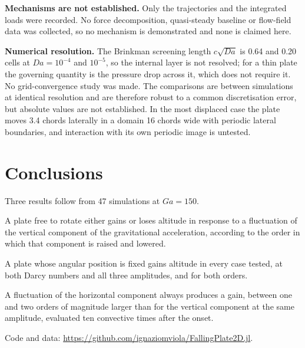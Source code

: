 \documentclass[11pt,a4paper]{article}
\begin{document}
\textbf{Mechanisms are not established.} Only the trajectories and the
integrated loads were recorded. No force decomposition, quasi-steady baseline
or flow-field data was collected, so no mechanism is demonstrated and none is
claimed here.

\textbf{Numerical resolution.} The Brinkman screening length $c\sqrt{Da}$ is
0.64 and 0.20 cells at $Da=10^{-4}$ and $10^{-5}$, so the internal layer is
not resolved; for a thin plate the governing quantity is the pressure drop
across it, which does not require it. No grid-convergence study was made. The
comparisons are between simulations at identical resolution and are therefore
robust to a common discretisation error, but absolute values are not
established. In the most displaced case the plate moves 3.4 chords laterally
in a domain 16 chords wide with periodic lateral boundaries, and interaction
with its own periodic image is untested.

\section{Conclusions}

Three results follow from 47 simulations at $Ga=150$.

A plate free to rotate either gains or loses altitude in response to a
fluctuation of the vertical component of the gravitational acceleration,
according to the order in which that component is raised and lowered.

A plate whose angular position is fixed gains altitude in every case tested,
at both Darcy numbers and all three amplitudes, and for both orders.

A fluctuation of the horizontal component always produces a gain, between one
and two orders of magnitude larger than for the vertical component at the same
amplitude, evaluated ten convective times after the onset.

\vspace{2mm}\noindent
Code and data: \url{https://github.com/ignaziomviola/FallingPlate2D.jl}.
\end{document}
